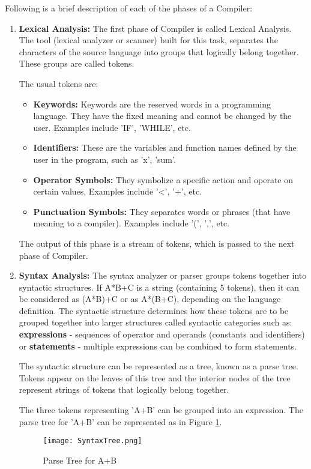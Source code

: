 Following is a brief description of each of the phases of a Compiler:
\begin{enumerate}
\item \textbf{Lexical Analysis:} The first phase of Compiler is called Lexical Analysis. The tool (lexical analyzer or scanner) built for this task, separates the characters of the source language into groups that logically belong together. These groups are called tokens.

The usual tokens are:
\begin{itemize}
\item \textbf{Keywords:} Keywords are the reserved words in a programming language. They have the fixed meaning and cannot be changed by the user. Examples include 'IF', 'WHILE', etc.
\item \textbf{Identifiers:} These are the variables and function names defined by the user in the program, such as 'x', 'sum'.
\item \textbf{Operator Symbols:} They symbolize a specific action and operate on certain values. Examples include '<', '+', etc.
\item \textbf{Punctuation Symbols:} They separates words or phrases (that have meaning to a compiler). Examples include '(', ',', etc.
\end{itemize}
The output of this phase is a stream of tokens, which is passed to the next phase of Compiler.

\item \textbf{Syntax Analysis:} The syntax analyzer or parser groups tokens together into syntactic structures. If A*B+C is a string (containing 5 tokens), then it can be considered as (A*B)+C or as A*(B+C), depending on the language definition. The syntactic structure determines how these tokens are to be grouped together into larger structures called syntactic categories such as: \textbf{expressions} - sequences of operator and operands (constants and identifiers) or \textbf{statements} - multiple expressions can be combined to form statements.

The syntactic structure can be represented as a tree, known as a parse tree. Tokens appear on the leaves of this tree and the interior nodes of the tree represent strings of tokens that logically belong together.
\begin{example}
The three tokens representing 'A+B' can be grouped into an expression. The parse tree for 'A+B' can be represented as in Figure \ref{fig:SyntaxTree}.
\begin{figure}
\centering
\texttt{[image: SyntaxTree.png]}
\caption{Parse Tree for A+B}
\label{fig:SyntaxTree}
\end{figure}
\end{example}


\end{enumerate}

